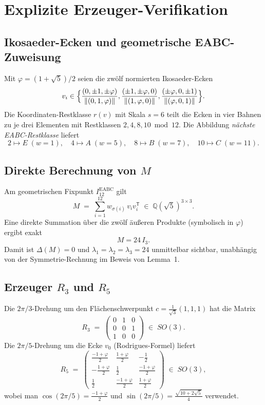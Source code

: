 \documentclass[11pt,a4paper]{article}
\newcommand{\Q}{\mathbb{Q}}
\begin{document}
\section{Explizite Erzeuger-Verifikation}
\label{app:generators}

\subsection{Ikosaeder-Ecken und geometrische EABC-Zuweisung}

Mit $\varphi=(1+\sqrt5)/2$ seien die zwölf normierten Ikosaeder-Ecken
\[
  v_i \in
  \Bigl\{
  \frac{(0,\pm1,\pm\varphi)}{\|(0,1,\varphi)\|},
  \frac{(\pm1,\pm\varphi,0)}{\|(1,\varphi,0)\|},
  \frac{(\pm\varphi,0,\pm1)}{\|(\varphi,0,1)\|}
  \Bigr\}.
\]
Die Koordinaten-Restklasse $r(v)$ mit Skala $s=6$ teilt die Ecken in vier
Bahnen zu je drei Elementen mit Restklassen $2,4,8,10\bmod 12$.
Die Abbildung \emph{nächste EABC-Restklasse} liefert
\[
  2\mapsto E\;(w=1),\quad
  4\mapsto A\;(w=5),\quad
  8\mapsto B\;(w=7),\quad
  10\mapsto C\;(w=11).
\]

\subsection{Direkte Berechnung von $M$}

Am geometrischen Fixpunkt $I_{12}^{\mathrm{EABC}}$ gilt
\[
  M
  \;=\;
  \sum_{i=1}^{12} w_{\sigma(i)}\, v_i v_i^{\mathsf T}
  \;\in\;
  \Q(\sqrt5)^{3\times 3}.
\]
Eine direkte Summation über die zwölf äußeren Produkte (symbolisch in
$\varphi$) ergibt exakt
\[
  M = 24\,I_3.
\]
Damit ist $\Delta(M)=0$ und $\lambda_1=\lambda_2=\lambda_3=24$ unmittelbar
sichtbar, unabhängig von der Symmetrie-Rechnung im Beweis von Lemma~1.

\subsection{Erzeuger $R_3$ und $R_5$}

Die $2\pi/3$-Drehung um den Flächenschwerpunkt $c=\tfrac{1}{\sqrt3}(1,1,1)$
hat die Matrix
\[
  R_3
  \;=\;
  \begin{pmatrix}
    0&1&0\\ 0&0&1\\ 1&0&0
  \end{pmatrix}
  \;\in\; SO(3).
\]
Die $2\pi/5$-Drehung um die Ecke $v_0$ (Rodrigues-Formel) liefert
\[
  R_5
  \;=\;
  \begin{pmatrix}
    \tfrac{-1+\varphi}{2} & \tfrac{1+\varphi}{2} & -\tfrac12 \\[4pt]
    -\tfrac{1+\varphi}{2} & \tfrac12 & \tfrac{-1+\varphi}{2} \\[4pt]
    \tfrac12 & \tfrac{-1+\varphi}{2} & \tfrac{1+\varphi}{2}
  \end{pmatrix}
  \;\in\; SO(3),
\]
wobei man $\cos(2\pi/5)=\tfrac{-1+\varphi}{2}$ und
$\sin(2\pi/5)=\tfrac{\sqrt{10+2\sqrt5}}{4}$ verwendet.
\end{document}
